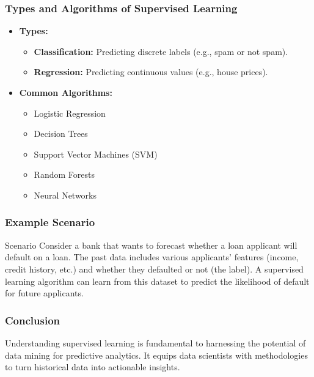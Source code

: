 \documentclass[aspectratio=169]{beamer}
\begin{document}
\begin{frame}[fragile]
    \frametitle{Types and Algorithms of Supervised Learning}
    \begin{itemize}
        \item \textbf{Types:}
        \begin{itemize}
            \item \textbf{Classification:} Predicting discrete labels (e.g., spam or not spam).
            \item \textbf{Regression:} Predicting continuous values (e.g., house prices).
        \end{itemize}
        
        \item \textbf{Common Algorithms:}
        \begin{itemize}
            \item Logistic Regression
            \item Decision Trees
            \item Support Vector Machines (SVM)
            \item Random Forests
            \item Neural Networks
        \end{itemize}
    \end{itemize}
\end{frame}

\begin{frame}[fragile]
    \frametitle{Example Scenario}
    \begin{block}{Scenario}
        Consider a bank that wants to forecast whether a loan applicant will default on a loan. The past data includes various applicants' features (income, credit history, etc.) and whether they defaulted or not (the label). A supervised learning algorithm can learn from this dataset to predict the likelihood of default for future applicants.
    \end{block}
\end{frame}

\begin{frame}[fragile]
    \frametitle{Conclusion}
    Understanding supervised learning is fundamental to harnessing the potential of data mining for predictive analytics. It equips data scientists with methodologies to turn historical data into actionable insights.
\end{frame}
\end{document}
